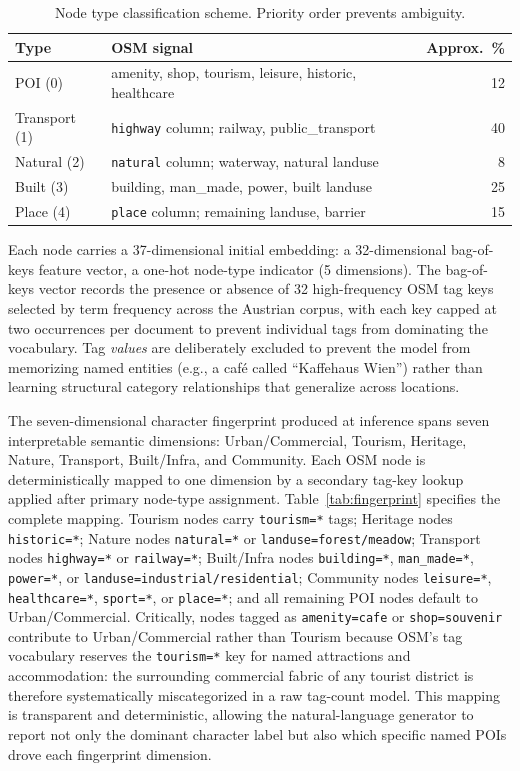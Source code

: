 \documentclass[]{interact}
\theoremstyle{plain}%
\theoremstyle{definition}
\theoremstyle{remark}
\begin{document}
\begin{table}[htbp]
\centering
\begin{tabularx}{\textwidth}{lXr}
\toprule
\textbf{Type} & \textbf{OSM signal} & \textbf{Approx.\ \%} \\
\midrule
POI (0)       & amenity, shop, tourism, leisure, historic, healthcare & 12 \\
Transport (1) & \texttt{highway} column; railway, public\_transport & 40 \\
Natural (2)   & \texttt{natural} column; waterway, natural landuse & 8 \\
Built (3)     & building, man\_made, power, built landuse & 25 \\
Place (4)     & \texttt{place} column; remaining landuse, barrier & 15 \\
\bottomrule
\end{tabularx}
\caption{Node type classification scheme. Priority order prevents ambiguity.}
\label{tab:nodetypes}
\end{table}

Each node carries a 37-dimensional initial embedding: a 32-dimensional bag-of-keys feature vector, a one-hot node-type indicator (5 dimensions). The bag-of-keys vector records the presence or absence of 32 high-frequency OSM tag keys selected by term frequency across the Austrian corpus, with each key capped at two occurrences per document to prevent individual tags from dominating the vocabulary. Tag \emph{values} are deliberately excluded to prevent the model from memorizing named entities (e.g., a café called ``Kaffehaus Wien'') rather than learning structural category relationships that generalize across locations.

The seven-dimensional character fingerprint produced at inference spans seven interpretable semantic dimensions: Urban/Commercial, Tourism, Heritage, Nature, Transport, Built/Infra, and Community. Each OSM node is deterministically mapped to one dimension by a secondary tag-key lookup applied after primary node-type assignment. Table~\ref{tab:fingerprint} specifies the complete mapping. Tourism nodes carry \texttt{tourism=*} tags; Heritage nodes \texttt{historic=*}; Nature nodes \texttt{natural=*} or \texttt{landuse=forest/meadow}; Transport nodes \texttt{highway=*} or \texttt{railway=*}; Built/Infra nodes \texttt{building=*}, \texttt{man\_made=*}, \texttt{power=*}, or \texttt{landuse=industrial/residential}; Community nodes \texttt{leisure=*}, \texttt{healthcare=*}, \texttt{sport=*}, or \texttt{place=*}; and all remaining POI nodes default to Urban/Commercial. Critically, nodes tagged as \texttt{amenity=cafe} or \texttt{shop=souvenir} contribute to Urban/Commercial rather than Tourism because OSM's tag vocabulary reserves the \texttt{tourism=*} key for named attractions and accommodation: the surrounding commercial fabric of any tourist district is therefore systematically miscategorized in a raw tag-count model. This mapping is transparent and deterministic, allowing the natural-language generator to report not only the dominant character label but also which specific named POIs drove each fingerprint dimension.
\end{document}

